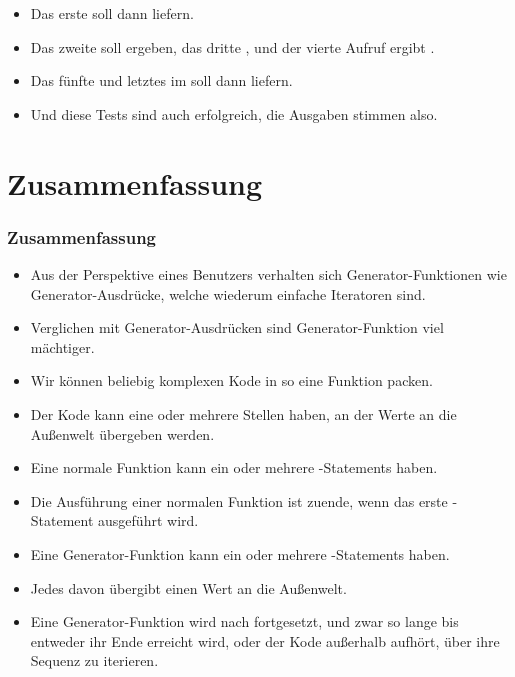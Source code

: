 \documentclass[aspectratio=169,mathserif,notheorems]{beamer}%
\begin{document}
\begin{frame}[t]
{{\begin{itemize}
{}%
%
\item<29-> Das erste  soll dann  liefern.%
%
\item<30-> Das zweite soll  ergeben, das dritte , und der vierte Aufruf ergibt .%
%
\item<31-> Das fünfte und letztes  im  soll dann   liefern.%
%
\item<32-> Und diese Tests sind auch erfolgreich, die Ausgaben stimmen also.%
\end{itemize}%
}}%
%
%
%
%
%
%
%
\end{frame}%
%
\section{Zusammenfassung}%
%
\begin{frame}%
\frametitle{Zusammenfassung}%
%
\begin{itemize}%
\item Aus der Perspektive eines Benutzers verhalten sich Generator-Funktionen wie Generator-Ausdrücke, welche wiederum einfache Iteratoren sind.%
%
\item<2-> Verglichen mit Generator-Ausdrücken sind Generator-Funktion viel mächtiger.%
%
\item<3-> Wir können beliebig komplexen Kode in so eine Funktion packen.%
%
\item<4-> Der Kode kann eine oder mehrere Stellen haben, an der Werte an die Außenwelt übergeben werden.%
%
\item<5-> Eine normale Funktion kann ein oder mehrere -Statements haben.%
%
\item<6-> Die Ausführung einer normalen Funktion ist zuende, wenn das erste -Statement ausgeführt wird.%
%
\item<7-> Eine Generator-Funktion kann ein oder mehrere -Statements haben.%
%
\item<8-> Jedes davon übergibt einen Wert an die Außenwelt.%
%
\item<9-> Eine Generator-Funktion wird nach  fortgesetzt, und zwar so lange bis entweder ihr Ende erreicht wird, oder der Kode außerhalb aufhört, über ihre Sequenz zu iterieren.%
\end{itemize}%
\end{frame}%
%
\endPresentation%
\end{document}
